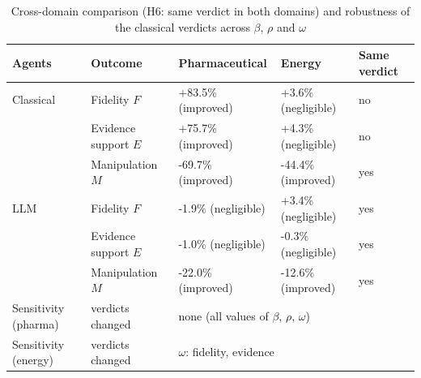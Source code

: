 \begin{table}[t]
\caption{Cross-domain comparison (H6: same verdict in both domains) and robustness of the classical verdicts across $\beta$, $\rho$ and $\omega$}\label{tab:cross}
\footnotesize
\begin{tabular}{@{}lllll@{}}
\toprule
Agents & Outcome & Pharmaceutical & Energy & Same verdict \\
\midrule
Classical & Fidelity $F$ & +83.5\% (improved) & +3.6\% (negligible) & no \\
 & Evidence support $E$ & +75.7\% (improved) & +4.3\% (negligible) & no \\
 & Manipulation $M$ & -69.7\% (improved) & -44.4\% (improved) & yes \\
LLM & Fidelity $F$ & -1.9\% (negligible) & +3.4\% (negligible) & yes \\
 & Evidence support $E$ & -1.0\% (negligible) & -0.3\% (negligible) & yes \\
 & Manipulation $M$ & -22.0\% (improved) & -12.6\% (improved) & yes \\
\midrule
Sensitivity (pharma) & verdicts changed & \multicolumn{3}{l}{none (all values of $\beta$, $\rho$, $\omega$)} \\
Sensitivity (energy) & verdicts changed & \multicolumn{3}{l}{$\omega$: fidelity, evidence} \\
\bottomrule
\end{tabular}
\end{table}
